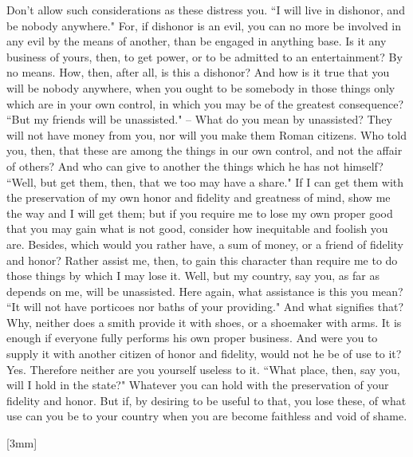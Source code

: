 \documentclass[imperial,twoside,12pt]{octavo}
\newcounter{original_page_count}
\newcommand{\marginticker}{
    \stepcounter{original_page_count}
    \marginnote{
        \color{red}
        \small{
            \roman{original_page_count}
        }
    }[3mm]
}
\begin{document}
Don't allow such considerations as these distress you. ``I will
live in dishonor, and be nobody anywhere." For, if dishonor is an
evil, you can no more be involved in any evil by the means of another,
than be engaged in anything base. Is it any business of yours, then,
to get power, or to be admitted to an entertainment? By no means.
How, then, after all, is this a dishonor? And how is it true that
you will be nobody anywhere, when you ought to be somebody in those
things only which are in your own control, in which you may be of
the greatest consequence? ``But my friends will be unassisted." --
What do you mean by unassisted? They will not have money from you,
nor will you make them Roman citizens. Who told you, then, that these
are among the things in our own control, and not the affair of others?
And who can give to another the things which he has not himself? ``Well,
but get them, then, that we too may have a share." If I can get them
with the preservation of my own honor and fidelity and greatness of
mind, show me the way and I will get them; but if you require me to
lose my own proper good that you may gain what is not good, consider
how inequitable and foolish you are. Besides, which would you rather
have, a sum of money, or a friend of fidelity and honor? Rather assist
me, then, to gain this character than require me to do those things
by which I may lose it. Well, but my country, say you, as far as depends
on me, will be unassisted. Here again, what assistance is this you
mean? ``It will not have porticoes nor baths of your providing." And
what signifies that? Why, neither does a smith provide it with shoes,
or a shoemaker with arms. It is enough if everyone fully performs
his own proper business. And were you to supply it with another citizen
of honor and fidelity, would not he be of use to it? Yes. Therefore
neither are you yourself useless to it. ``What place, then, say you,
will I hold in the state?" Whatever you can hold with the preservation
of your fidelity and honor. But if, by desiring to be useful to that,
you lose these, of what use can you be to your country when you are
become faithless and void of shame. 

\marginticker{}
\end{document}
